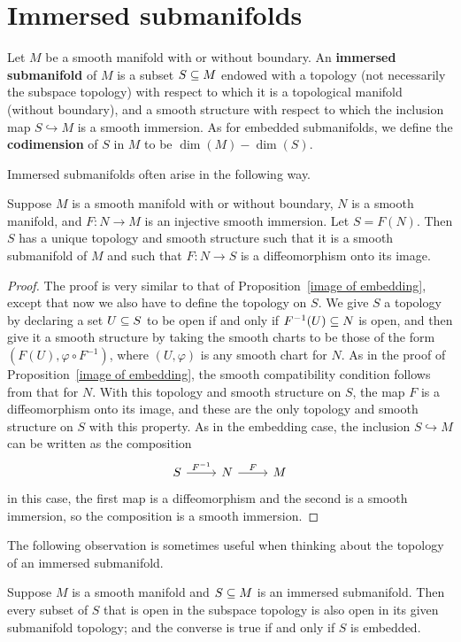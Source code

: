 \section{Immersed submanifolds}
Let $M$ be a smooth manifold with or without boundary. An \textbf{immersed submanifold} of $M$ is a subset $S\subseteq M$ endowed with a topology (not necessarily the subspace topology) with respect to which it is a topological manifold (without boundary), and a smooth structure with respect to which the inclusion map $S\hookrightarrow M$ is a smooth immersion. As for embedded submanifolds, we define the \textbf{codimension} of $S$ in $M$ to be $\dim(M)-\dim(S)$.\par
Immersed submanifolds often arise in the following way.
\begin{theorem}\label{image immersion submani}
Suppose $M$ is a smooth manifold with or without boundary, $N$ is a smooth manifold, and $F:N\to M$ is an injective smooth immersion. Let $S=F(N)$. Then $S$ has a unique topology and smooth structure such that it is a smooth submanifold of $M$ and such that $F:N\to S$ is a diffeomorphism onto its image.
\end{theorem}
\begin{proof}
The proof is very similar to that of Proposition~\ref{image of embedding}, except that now we also have to define the topology on $S$. We give $S$ a topology by declaring a set $U\subseteq S$ to be open if and only if $F^{-1}(U)\subseteq N$ is open, and then give it a smooth structure by taking the smooth charts to be those of the form $(F(U),\varphi\circ F^{-1})$, where $(U,\varphi)$ is any smooth chart for $N$. As in the proof of Proposition~\ref{image of embedding}, the smooth compatibility condition follows from that for $N$. With this topology and smooth structure on $S$, the map $F$ is a diffeomorphism onto its image, and these are the only topology and smooth structure on $S$ with this property. As in the embedding case, the inclusion $S\hookrightarrow M$ can be written as the composition
\[\begin{tikzcd}
S\ar[r,"F^{-1}"]&N\ar[r,"F"]&M
\end{tikzcd}\]
in this case, the first map is a diffeomorphism and the second is a smooth immersion, so the composition is a smooth immersion.
\end{proof}
The following observation is sometimes useful when thinking about the topology of an immersed submanifold.
\begin{proposition}\label{immersed submani topo}
Suppose $M$ is a smooth manifold and $S\subseteq M$ is an immersed submanifold. Then every subset of $S$ that is open in the subspace topology is also open in its given submanifold topology; and the converse is true if and only if $S$ is embedded.
\end{proposition}

